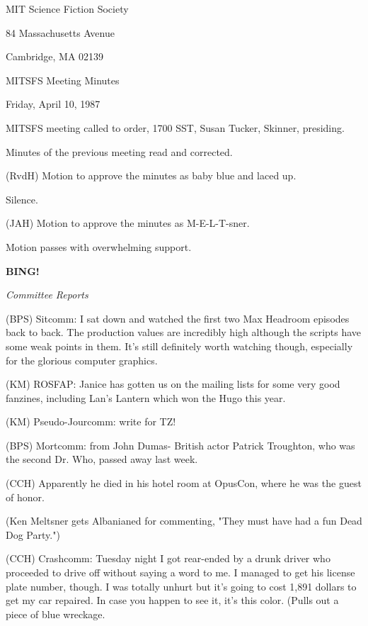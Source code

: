 \documentclass[12pt]{article}
\newcommand{\bing}{{\bf BING!} }
\newcommand{\goto}[1]{\bing \vskip 12pt \centerline{{\em{#1}}}}
\begin{document}
\begin{center}

MIT Science Fiction Society 

84 Massachusetts Avenue

Cambridge, MA 02139

\vspace{12pt}

MITSFS Meeting Minutes 

Friday, April 10, 1987

\end{center}
 
\vspace{18pt}

\setlength{\parskip}{6pt}

\noindent
MITSFS meeting called to order, 1700 SST,
Susan Tucker, Skinner, presiding.

Minutes of the previous meeting read and corrected.

(RvdH) Motion to approve the minutes as baby blue and laced up.

Silence.

(JAH) Motion to approve the minutes as M-E-L-T-sner.

Motion passes with overwhelming support.

\goto{Committee Reports}

(BPS) Sitcomm: I sat down and watched the first two Max Headroom episodes back to back. The production values are incredibly high although the scripts have some weak points in them. It's still definitely worth watching though, especially for the glorious computer graphics.

(KM) ROSFAP: Janice has gotten us on the mailing lists for some very good fanzines, including Lan's Lantern which won the Hugo this year.

(KM) Pseudo-Jourcomm: write for TZ!

(BPS) Mortcomm: from John Dumas- British actor Patrick Troughton, who was the second Dr. Who, passed away last week.

(CCH) Apparently he died in his hotel room at OpusCon, where he was the guest of honor.

(Ken Meltsner gets Albanianed for commenting, "They must have had a fun Dead Dog Party.")

(CCH) Crashcomm: Tuesday night I got rear-ended by a drunk driver who proceeded to drive off without saying a word to me. I managed to get his license plate number, though. I was totally unhurt but it's going to cost 1,891 dollars to get my car repaired. In case you happen to see it, it's this color. (Pulls out a piece of blue wreckage.
\end{document}
